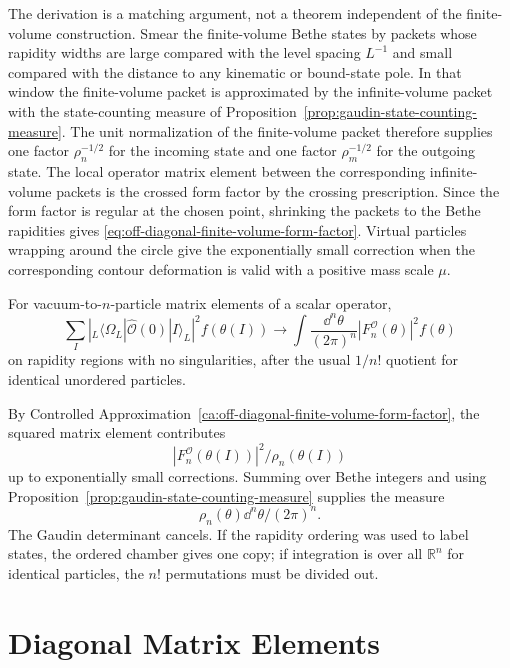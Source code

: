 The derivation is a matching argument, not a theorem independent of the
finite-volume construction.
Smear the finite-volume Bethe states by packets whose rapidity widths are
large compared with the level spacing \(L^{-1}\) and small compared with the
distance to any kinematic or bound-state pole.  In that window the
finite-volume packet is approximated by the infinite-volume packet with the
state-counting measure of Proposition~\ref{prop:gaudin-state-counting-measure}.
The unit normalization of the finite-volume packet therefore supplies one
factor \(\rho_n^{-1/2}\) for the incoming state and one factor
\(\rho_m^{-1/2}\) for the outgoing state.  The local operator matrix element
between the corresponding infinite-volume packets is the crossed form factor
by the crossing prescription.  Since the form factor is regular at the
chosen point, shrinking the packets to the Bethe rapidities gives
\eqref{eq:off-diagonal-finite-volume-form-factor}.  Virtual particles
wrapping around the circle give the exponentially small correction when the
corresponding contour deformation is valid with a positive mass scale \(\mu\).

\begin{remark}
\label{rem:finite-volume-sum-integral-cancellation}
For vacuum-to-\(n\)-particle matrix elements of a scalar operator,
\[
  \sum_I
  \left|
  {}_L\!\langle\Omega_L|\widehat{\mathcal O}(0)|I\rangle_L
  \right|^2 f(\theta(I))
  \longrightarrow
  \int
  \frac{\dd^n\theta}{(2\pi)^n}
  |F_n^{\mathcal O}(\theta)|^2f(\theta)
\]
on rapidity regions with no singularities, after the usual \(1/n!\) quotient
for identical unordered particles.
\end{remark}

By Controlled Approximation~\ref{ca:off-diagonal-finite-volume-form-factor},
the squared
matrix element contributes
\[
  |F_n^{\mathcal O}(\theta(I))|^2/\rho_n(\theta(I))
\]
up to exponentially small corrections.  Summing over Bethe integers and
using Proposition~\ref{prop:gaudin-state-counting-measure} supplies the
measure
\[
  \rho_n(\theta)\dd^n\theta/(2\pi)^n .
\]
The Gaudin determinant cancels.  If the rapidity ordering was used to label
states, the ordered chamber gives one copy; if integration is over all
\(\mathbb R^n\) for identical particles, the \(n!\) permutations must be
divided out.

\section{Diagonal Matrix Elements}

